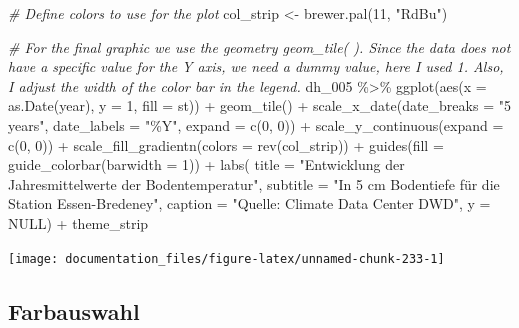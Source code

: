 \documentclass[
]{article}
\newenvironment{Shaded}{\begin{snugshade}}{\end{snugshade}}
\newcommand{\AttributeTok}[1]{\textcolor[rgb]{0.77,0.63,0.00}{#1}}
\newcommand{\CommentTok}[1]{\textcolor[rgb]{0.56,0.35,0.01}{\textit{#1}}}
\newcommand{\ConstantTok}[1]{\textcolor[rgb]{0.00,0.00,0.00}{#1}}
\newcommand{\DecValTok}[1]{\textcolor[rgb]{0.00,0.00,0.81}{#1}}
\newcommand{\FunctionTok}[1]{\textcolor[rgb]{0.00,0.00,0.00}{#1}}
\newcommand{\NormalTok}[1]{#1}
\newcommand{\OtherTok}[1]{\textcolor[rgb]{0.56,0.35,0.01}{#1}}
\newcommand{\SpecialCharTok}[1]{\textcolor[rgb]{0.00,0.00,0.00}{#1}}
\newcommand{\StringTok}[1]{\textcolor[rgb]{0.31,0.60,0.02}{#1}}
\begin{document}
\begin{Shaded}
\begin{Highlighting}[]
\CommentTok{\# Define colors to use for the plot}
\NormalTok{col\_strip }\OtherTok{\textless{}{-}} \FunctionTok{brewer.pal}\NormalTok{(}\DecValTok{11}\NormalTok{, }\StringTok{"RdBu"}\NormalTok{)}

\CommentTok{\# For the final graphic we use the geometry geom\_tile( ). Since the data does not have a specific value for the Y axis, we need a dummy value, here I used 1. Also, I adjust the width of the color bar in the legend.}
\NormalTok{dh\_005 }\SpecialCharTok{\%\textgreater{}\%}
  \FunctionTok{ggplot}\NormalTok{(}\FunctionTok{aes}\NormalTok{(}\AttributeTok{x =} \FunctionTok{as.Date}\NormalTok{(year), }\AttributeTok{y =} \DecValTok{1}\NormalTok{, }\AttributeTok{fill =}\NormalTok{ st)) }\SpecialCharTok{+}
  \FunctionTok{geom\_tile}\NormalTok{() }\SpecialCharTok{+}
  \FunctionTok{scale\_x\_date}\NormalTok{(}\AttributeTok{date\_breaks =} \StringTok{"5 years"}\NormalTok{,}
               \AttributeTok{date\_labels =} \StringTok{"\%Y"}\NormalTok{,}
               \AttributeTok{expand =} \FunctionTok{c}\NormalTok{(}\DecValTok{0}\NormalTok{, }\DecValTok{0}\NormalTok{)) }\SpecialCharTok{+}
  \FunctionTok{scale\_y\_continuous}\NormalTok{(}\AttributeTok{expand =} \FunctionTok{c}\NormalTok{(}\DecValTok{0}\NormalTok{, }\DecValTok{0}\NormalTok{)) }\SpecialCharTok{+}
  \FunctionTok{scale\_fill\_gradientn}\NormalTok{(}\AttributeTok{colors =} \FunctionTok{rev}\NormalTok{(col\_strip)) }\SpecialCharTok{+}
  \FunctionTok{guides}\NormalTok{(}\AttributeTok{fill =} \FunctionTok{guide\_colorbar}\NormalTok{(}\AttributeTok{barwidth =} \DecValTok{1}\NormalTok{)) }\SpecialCharTok{+}
  \FunctionTok{labs}\NormalTok{(}
    \AttributeTok{title =} \StringTok{"Entwicklung der Jahresmittelwerte der Bodentemperatur"}\NormalTok{,}
    \AttributeTok{subtitle =} \StringTok{"In 5 cm Bodentiefe für die Station Essen{-}Bredeney"}\NormalTok{,}
    \AttributeTok{caption =} \StringTok{"Quelle: Climate Data Center DWD"}\NormalTok{, }
    \AttributeTok{y =} \ConstantTok{NULL}\NormalTok{) }\SpecialCharTok{+}
\NormalTok{  theme\_strip}
\end{Highlighting}
\end{Shaded}

\begin{center}\texttt{[image: documentation\_files/figure-latex/unnamed-chunk-233-1]} \end{center}

\hypertarget{farbauswahl}{%
\subsection{Farbauswahl}\label{farbauswahl}}
\end{document}
